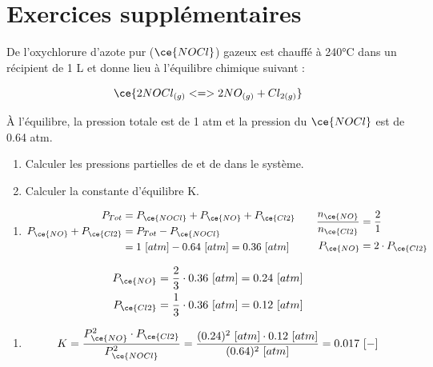 \documentclass[
  11pt,
  a4paper,
  openany]{book}
\providecommand{\tightlist}{%
  \setlength{\itemsep}{0pt}\setlength{\parskip}{0pt}}
\begin{document}
\hypertarget{exercices-suppluxe9mentaires-12}{%
\section{Exercices supplémentaires}\label{exercices-suppluxe9mentaires-12}}

\begin{Exercise}

De l'oxychlorure d'azote pur (\(\ce{NOCl}\)) gazeux est chauffé à 240°C dans un récipient de 1 L et donne lieu à l'équilibre chimique suivant :

\[
\ce{2 NOCl_{(g)} <=> 2 NO_{(g)} + Cl_{2(g)}}
\]

À l'équilibre, la pression totale est de 1 atm et la pression du \(\ce{NOCl}\) est de 0.64 atm.

\begin{enumerate}
\def\labelenumi{\alph{enumi}.}
\tightlist
\item
  Calculer les pressions partielles de  et de  dans le système.
\item
  Calculer la constante d'équilibre K.
\end{enumerate}

\end{Exercise}

\begin{Answer}

\begin{enumerate}
\def\labelenumi{\alph{enumi}.}
\tightlist
\item
  \[
  \begin{split}
  P_{Tot} &= P_{\ce{NOCl}} + P_{\ce{NO}} + P_{\ce{Cl2}} \\
  P_{\ce{NO}} + P_{\ce{Cl2}} &= P_{Tot} - P_{\ce{NOCl}} \\
  &= 1\ [atm] - 0.64\ [atm] = 0.36\ [atm]
  \end{split}
  \qquad
  \begin{split}
  \frac{n_{\ce{NO}}}{n_{\ce{Cl2}}} &= \frac{2}{1} \\
  P_{\ce{NO}} &= 2 \cdot P_{\ce{Cl2}}
  \end{split}
  \]
\end{enumerate}

\[
\begin{split}
P_{\ce{NO}} &= \frac{2}{3} \cdot 0.36\ [atm] = 0.24\ [atm] \\
P_{\ce{Cl2}} &= \frac{1}{3} \cdot 0.36\ [atm] = 0.12\ [atm]
\end{split}
\]

\begin{enumerate}
\def\labelenumi{\alph{enumi}.}
\setcounter{enumi}{1}
\tightlist
\item
  \[
  \begin{split}
  K = \frac{P_{\ce{NO}}^2 \cdot P_{\ce{Cl2}} }{P_{\ce{NOCl}}^2} = \frac{(0.24)^2\ [atm] \cdot 0.12\ [atm]}{(0.64)^2\ [atm]} = 0.017\ [-]
  \end{split}
  \]
\end{enumerate}

\end{Answer}
\end{document}
